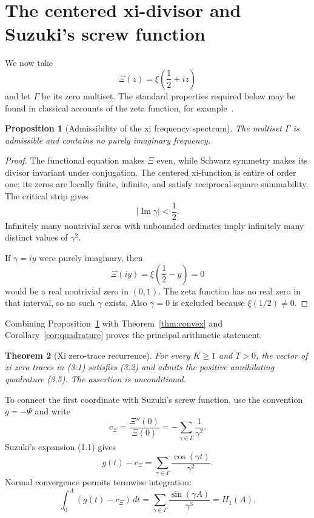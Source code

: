 \documentclass[11pt]{article}
\newtheorem{theorem}{Theorem}[section]
\newtheorem{proposition}[theorem]{Proposition}
\theoremstyle{remark}
\begin{document}
\section{The centered xi-divisor and Suzuki's screw function}
\label{sec:xi}

We now take
\[
 \Xi(z)=\xi\!\left(\frac12+iz\right)
\]
and let $\Gamma$ be its zero multiset.  The standard properties required below may be found in
classical accounts of the zeta function, for example~\cite{Titchmarsh1986}.

\begin{proposition}[Admissibility of the xi frequency spectrum]
\label{prop:xi-admissible}
The multiset $\Gamma$ is admissible and contains no purely imaginary frequency.
\end{proposition}

\begin{proof}
The functional equation makes $\Xi$ even, while Schwarz symmetry makes its divisor invariant under
conjugation.  The centered xi-function is entire of order one; its zeros are locally finite,
infinite, and satisfy reciprocal-square summability.  The critical strip gives
\[
 |\operatorname{Im}\gamma|<\frac12.
\]
Infinitely many nontrivial zeros with unbounded ordinates imply infinitely many distinct values of
$\gamma^2$.

If $\gamma=iy$ were purely imaginary, then
\[
 \Xi(iy)=\xi\!\left(\frac12-y\right)=0
\]
would be a real nontrivial zero in $(0,1)$.  The zeta function has no real zero in that interval,
so no such $\gamma$ exists.  Also $\gamma=0$ is excluded because $\xi(1/2)\neq0$.
\end{proof}

Combining Proposition~\ref{prop:xi-admissible} with Theorem~\ref{thm:convex} and
Corollary~\ref{cor:quadrature} proves the principal arithmetic statement.

\begin{theorem}[Xi zero-trace recurrence]
\label{thm:xi}
For every $K\geq1$ and $T>0$, the vector of xi zero traces in \emph{(3.1)} satisfies \emph{(3.2)}
and admits the positive annihilating quadrature \emph{(3.5)}.  The assertion is unconditional.
\end{theorem}

To connect the first coordinate with Suzuki's screw function, use the convention
$g=-\Psi$ and write
\[
 c_\Xi=\frac{\Xi''(0)}{\Xi(0)}
      =-\sum_{\gamma\in\Gamma}\frac1{\gamma^2}.
 \tag{4.1}
\]
Suzuki's expansion (1.1) gives
\[
 g(t)-c_\Xi
 =\sum_{\gamma\in\Gamma}\frac{\cos(\gamma t)}{\gamma^2}.
 \tag{4.2}
\]
Normal convergence permits termwise integration:
\[
 \int_0^A(g(t)-c_\Xi)\,dt
 =\sum_{\gamma\in\Gamma}\frac{\sin(\gamma A)}{\gamma^3}
 =H_1(A).
 \tag{4.3}
\]
\end{document}
